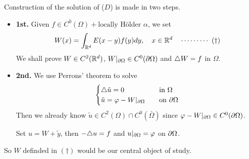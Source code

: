 \documentclass[12pt,a4paper]{article}
\renewenvironment{i}
{\begin{itemize} 
	}%
	{\end{itemize}
}
\begin{document}
Construction of the solution of ($D$) is made in two steps.
\begin{i}
\item[\textbf{1st.}] Given $f\in C^0(\Omega) + \text{locally H\"older } \alpha$, we set
\begin{align*}
W(x) = \int_{\mathbb{R}^d} E(x-y) f(y) dy, \quad x\in \mathbb{R}^d \quad \cdots\cdots\cdots\,\,(\dagger)
\end{align*}
We shall prove $W\in C^2(\mathbb{R}^d)$, $W|_{\partial \Omega} \in C^0(\partial \Omega)$ and $\triangle W=f$ in $\Omega$.

\item[\textbf{2nd.}] We use Perrons' theorem to solve
\begin{align*}
\begin{cases}
\triangle \tilde u =0\quad &\text{in } \Omega\\
\tilde u = \varphi - W|_{\partial \Omega}\quad &\text{on } \partial \Omega
\end{cases}
\end{align*}
Then we already know $\tilde u\in C^2(\Omega) \cap C^0(\bar{\Omega})$ since $\varphi - W|_{\partial \Omega} \in C^0(\partial \Omega)$.

\quad Set $u = W+ \tilde{y}$, then $-\triangle u =f$ and $u|_{\partial \Omega} = \varphi$ on $\partial \Omega$.
\end{i}
\s

So $W$ definded in $(\dagger)$ would be our central object of study.
\s
\end{document}
